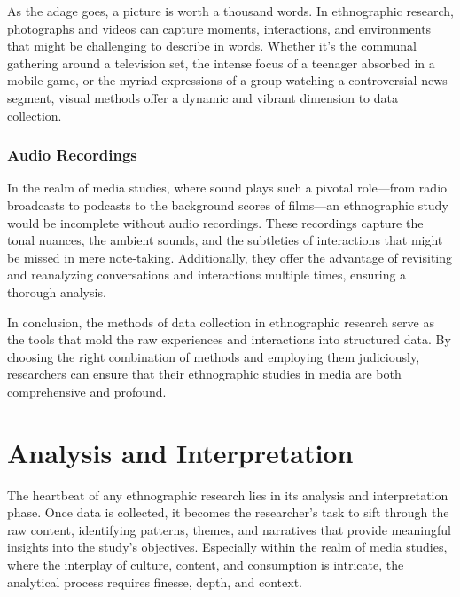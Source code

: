 \documentclass[
  b5paper]{book}
\begin{document}
As the adage goes, a picture is worth a thousand words. In ethnographic research, photographs and videos can capture moments, interactions, and environments that might be challenging to describe in words. Whether it's the communal gathering around a television set, the intense focus of a teenager absorbed in a mobile game, or the myriad expressions of a group watching a controversial news segment, visual methods offer a dynamic and vibrant dimension to data collection.

\hypertarget{audio-recordings}{%
\subsubsection*{Audio Recordings}\label{audio-recordings}}

In the realm of media studies, where sound plays such a pivotal role---from radio broadcasts to podcasts to the background scores of films---an ethnographic study would be incomplete without audio recordings. These recordings capture the tonal nuances, the ambient sounds, and the subtleties of interactions that might be missed in mere note-taking. Additionally, they offer the advantage of revisiting and reanalyzing conversations and interactions multiple times, ensuring a thorough analysis.

In conclusion, the methods of data collection in ethnographic research serve as the tools that mold the raw experiences and interactions into structured data. By choosing the right combination of methods and employing them judiciously, researchers can ensure that their ethnographic studies in media are both comprehensive and profound.

\hypertarget{analysis-and-interpretation}{%
\section{Analysis and Interpretation}\label{analysis-and-interpretation}}

The heartbeat of any ethnographic research lies in its analysis and interpretation phase. Once data is collected, it becomes the researcher's task to sift through the raw content, identifying patterns, themes, and narratives that provide meaningful insights into the study's objectives. Especially within the realm of media studies, where the interplay of culture, content, and consumption is intricate, the analytical process requires finesse, depth, and context.
\end{document}
